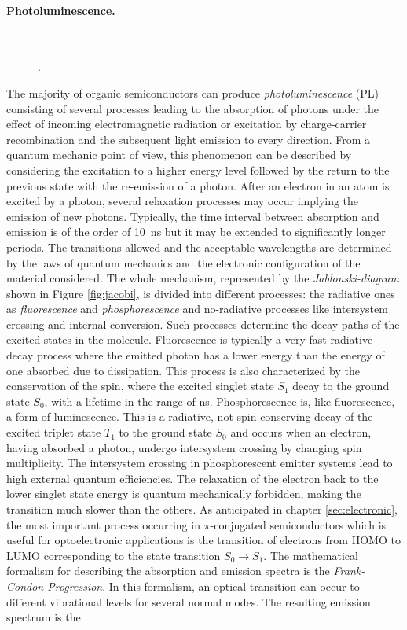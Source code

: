 \documentclass  [
  paper    = a4,
  BCOR     = 10mm,
  twoside,
  fontsize = 12pt,
  fleqn,
  toc      = bibnumbered,
  toc      = listofnumbered,
  numbers  = noendperiod,
  headings = normal,
  listof   = leveldown,
  version  = 3.03
]                                       {scrreprt}
\begin{document}
\paragraph{Photoluminescence.}
\begin{figure}[t]
	\centering%
	\\
	\caption{\footnotesize \cite{book:koehler}.}
	\label{fig:frank}
\end{figure}
The majority of organic semiconductors can produce \emph{photoluminescence} (PL) consisting of several processes leading to the absorption of photons under the effect of incoming electromagnetic radiation or excitation by charge-carrier recombination and the subsequent light emission to every direction. From a quantum mechanic point of view, this phenomenon can be described  by considering the excitation to a higher energy level followed by the return to the previous state with the re-emission of a photon. After an electron in an atom is excited by a photon, several relaxation processes may occur implying the emission of new photons. Typically, the time interval between absorption and emission is of the order of \SI{10}{\nano\second} but it may be extended to significantly longer periods. The transitions allowed and the acceptable wavelengths are determined by the laws of quantum mechanics and the electronic configuration of the material considered. The whole mechanism, represented by the \emph{Jablonski-diagram} shown in Figure \ref{fig:jacobi}, is divided into different processes: the radiative ones as \emph{fluorescence} and \emph{phosphorescence} and no-radiative processes like intersystem crossing and internal conversion. Such processes determine the decay paths of the excited states in the molecule. Fluorescence is typically a very fast radiative decay process where the emitted photon has a lower energy than the energy of one absorbed due to dissipation. This process is also characterized by the conservation of the spin, where the excited singlet state $S_1$ decay to the ground state $S_0$, with a lifetime in the range of ns. Phosphorescence is, like fluorescence, a form of luminescence. This is a radiative, not spin-conserving decay of the excited triplet state $T_1$ to the ground state $S_0$ and occurs when an electron, having absorbed a photon, undergo intersystem crossing by changing spin multiplicity. The intersystem crossing in phosphorescent emitter systems lead to high external quantum efficiencies. The relaxation of the electron back to the lower singlet state energy is quantum mechanically forbidden, making the transition much slower than the others. As anticipated in chapter \ref{sec:electronic}, the most important process occurring in $\pi$-conjugated semiconductors which is useful for optoelectronic applications is the transition of electrons from HOMO to LUMO corresponding to the state transition $S_0\rightarrow S_1$. The mathematical formalism for describing the absorption and emission spectra is the \emph{Frank-Condon-Progression}. In this formalism, an optical transition can occur to different vibrational levels for several normal modes. The resulting emission spectrum is the 
\end{document}
